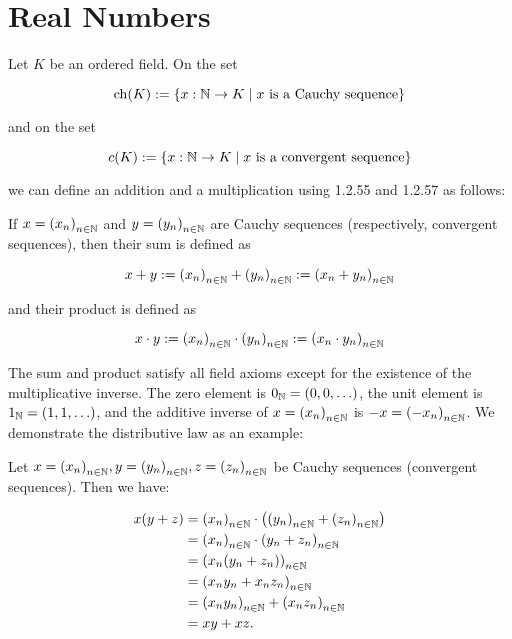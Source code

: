 \newpage
\section{Real Numbers}

Let \( K \) be an ordered field. On the set
		
\[
	\operatorname{ch}(K) := \{ x : \mathbb{N} \to K \mid x \text{ is a Cauchy sequence} \}
\]
		
and on the set
	
\[
	c(K) := \{ x : \mathbb{N} \to K \mid x \text{ is a convergent sequence} \}
\]

we can define an addition and a multiplication using 1.2.55 and 1.2.57 as follows:

If \( x = {(x_n)}_{n \in \mathbb{N}} \) and \( y = {(y_n)}_{n \in \mathbb{N}} \) are Cauchy sequences (respectively, convergent sequences), then their sum is defined as
	
\[
	x + y := {(x_n)}_{n \in \mathbb{N}} + {(y_n)}_{n \in \mathbb{N}} := {(x_n + y_n)}_{n \in \mathbb{N}}
\]
	
and their product is defined as

\[
	x \cdot y := {(x_n)}_{n \in \mathbb{N}} \cdot {(y_n)}_{n \in \mathbb{N}} := {(x_n \cdot y_n)}_{n \in \mathbb{N}}
\]

The sum and product satisfy all field axioms except for the existence of the multiplicative inverse.
The zero element is \( 0_{\mathbb{N}} = (0, 0, \ldots) \), the unit element is \( 1_{\mathbb{N}} = (1, 1, \ldots) \), and the additive inverse of \( x = {(x_n)}_{n \in \mathbb{N}} \) is \( -x = {(-x_n)}_{n \in \mathbb{N}} \).
We demonstrate the distributive law as an example:

Let \( x = {(x_n)}_{n \in \mathbb{N}}, y = {(y_n)}_{n \in \mathbb{N}}, z = {(z_n)}_{n \in \mathbb{N}} \) be Cauchy sequences (convergent sequences). Then we have:

\begin{align*}
	x(y + z) &= {(x_n)}_{n \in \mathbb{N}} \cdot \left( {(y_n)}_{n \in \mathbb{N}} + {(z_n)}_{n \in \mathbb{N}} \right)\\
	&= {(x_n)}_{n \in \mathbb{N}} \cdot {(y_n + z_n)}_{n \in \mathbb{N}}\\ 
	&= {(x_n (y_n + z_n))}_{n \in \mathbb{N}}\\
	&= {(x_n y_n + x_n z_n)}_{n \in \mathbb{N}}\\
	&= {(x_n y_n)}_{n \in \mathbb{N}} + {(x_n z_n)}_{n \in \mathbb{N}}\\
	&= xy + xz.
\end{align*}

